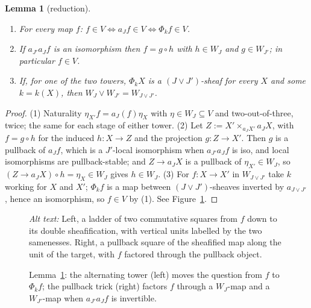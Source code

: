 \documentclass[11pt]{amsart}
\newtheorem{lem}[thm]{Lemma}
\theoremstyle{definition}
\begin{document}
\begin{lem}[reduction]\label{lem:reduction}
\begin{enumerate}
\item For every map $f$: $f\in V\iff a_Jf\in V\iff\Phi_kf\in V$.
\item If $a_{J'}a_Jf$ is an isomorphism then $f=g\circ h$ with $h\in W_J$ and
$g\in W_{J'}$; in particular $f\in V$.
\item If, for one of the two towers, $\Phi_kX$ is a $(J\vee J')$-sheaf for
every $X$ and some $k=k(X)$, then $W_J\vee W_{J'}=W_{J\vee J'}$.
\end{enumerate}
\end{lem}
\begin{proof}
(1) Naturality $\eta_{X'}f=a_J(f)\eta_X$ with $\eta\in W_J\subseteq V$ and
two-out-of-three, twice; the same for each stage of either tower. (2) Let $Z:=X'\times_{a_JX'}a_JX$, with $f=g\circ h$
for the induced $h\colon X\to Z$ and the projection $g\colon Z\to X'$. Then $g$ is
a pullback of $a_Jf$, which is a $J'$-local isomorphism when $a_{J'}a_Jf$ is
iso, and local isomorphisms are pullback-stable; and $Z\to a_JX$ is a pullback
of $\eta_{X'}\in W_J$, so $(Z\to a_JX)\circ h=\eta_X\in W_J$ gives $h\in W_J$.
(3) For $f\colon X\to X'$ in $W_{J\vee J'}$ take $k$ working for $X$ and $X'$;
$\Phi_kf$ is a map between $(J\vee J')$-sheaves inverted by $a_{J\vee J'}$,
hence an isomorphism, so $f\in V$ by (1). See Figure~\ref{fig:reduction}.
\end{proof}

\begin{figure}[ht]
\centering
{}
\qquad
{}
\caption{Lemma~\ref{lem:reduction}: the alternating tower (left) moves the
question from $f$ to $\Phi_kf$; the pullback trick (right) factors $f$ through
a $W_J$-map and a $W_{J'}$-map when $a_{J'}a_Jf$ is invertible.}
\label{fig:reduction}
\par\smallskip\noindent\textit{Alt text:} Left, a ladder of two commutative
squares from $f$ down to its double sheafification, with vertical units
labelled by the two samenesses. Right, a pullback square of the sheafified map
along the unit of the target, with $f$ factored through the pullback object.
\end{figure}
\end{document}
